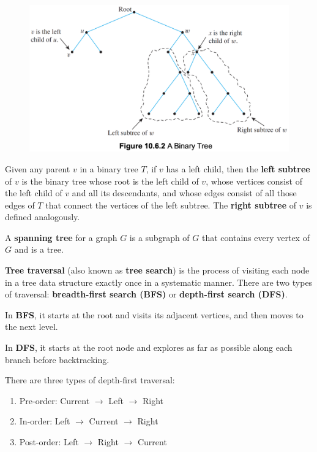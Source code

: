 \documentclass{article}
\begin{document}
\begin{description}
    \begin{figure}[H]
    	\centering
		\includegraphics[scale=0.4]{btree}
    \end{figure}
    
    \item[Left Subtree, Right Subtree]Given any parent $v$ in a binary tree $T$, if $v$ has a left child, then the \textbf{left subtree} of $v$ is the binary tree whose root is the left child of $v$, whose vertices consist of the left child of $v$ and all its descendants, and whose edges consist of all those edges of $T$ that connect the vertices of the left subtree. The \textbf{right subtree} of $v$ is defined analogously.
    \item[Spanning Tree]A \textbf{spanning tree} for a graph $G$ is a subgraph of $G$ that contains every vertex of $G$ and is a tree.
    \item[Binary Tree Traversal] \textbf{Tree traversal} (also known as \textbf{tree search}) is the process of visiting each node in a tree data structure exactly once in a systematic manner. There are two types of traversal: \textbf{breadth-first search (BFS)} or \textbf{depth-first search (DFS)}. 
    \item \qquad In \textbf{BFS}, it starts at the root and visits its adjacent vertices, and then moves to the next level. 
    \item \qquad In \textbf{DFS}, it starts at the root node and explores as far as possible along each branch before backtracking. 
    \item \qquad There are three types of depth-first traversal: 
	\begin{enumerate}
		\item Pre-order: Current $\to$ Left $\to$ Right
		\item In-order: Left $\to$ Current $\to$ Right 
		\item Post-order: Left $\to$ Right $\to$ Current
	\end{enumerate}
	

\end{description}
\end{document}
